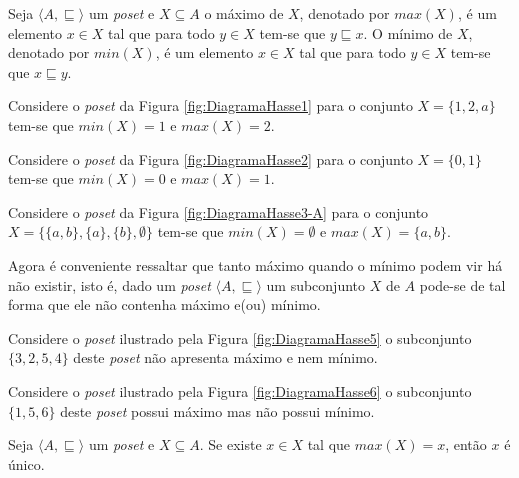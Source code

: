 \begin{definition}\label{def:MaxMinPoset}
	Seja $\langle A, \sqsubseteq \rangle$ um \textit{poset} e $X \subseteq A$ o máximo de $X$, denotado por $max(X)$, é um elemento $x \in X$ tal que para todo $y \in X$ tem-se que $y \sqsubseteq x$. O mínimo de $X$, denotado por $min(X)$,  é um elemento $x \in X$ tal que  para todo $y \in X$ tem-se que $x \sqsubseteq y$.
\end{definition}

\begin{example}
	Considere o \textit{poset} da Figura \ref{fig:DiagramaHasse1} para o conjunto $X = \{1, 2, a\}$ tem-se que $min(X) = 1$ e $max(X) = 2$.
\end{example}

\begin{example}
	Considere o \textit{poset} da Figura \ref{fig:DiagramaHasse2} para o conjunto $X = \{0, 1\}$ tem-se que $min(X) = 0$ e $max(X) = 1$.
\end{example}

\begin{example}
	Considere o \textit{poset} da Figura \ref{fig:DiagramaHasse3-A} para o conjunto $X = \{\{a, b\}, \{a\}, \{b\}, \emptyset\}$ tem-se que $min(X) = \emptyset$ e $max(X) = \{a, b\}$.
\end{example}

Agora é conveniente ressaltar que tanto máximo quando o mínimo podem vir há não existir, isto é, dado um \textit{poset} $\langle A, \sqsubseteq \rangle$ um subconjunto $X$ de $A$ pode-se de tal forma que ele não contenha máximo e(ou) mínimo.

\begin{example}
	Considere o \textit{poset} ilustrado pela Figura \ref{fig:DiagramaHasse5} o subconjunto $\{3, 2, 5, 4\}$ deste \textit{poset} não apresenta máximo e nem mínimo.
\end{example}

\begin{example}
	Considere o \textit{poset} ilustrado pela Figura \ref{fig:DiagramaHasse6} o subconjunto $\{1, 5, 6\}$ deste \textit{poset} possui máximo mas não possui mínimo.
\end{example}

\begin{theorem}\label{teo:UnicidadeMaximoPoset}
	Seja $\langle A, \sqsubseteq \rangle$ um \textit{poset} e $X \subseteq A$. Se existe $x \in X$ tal que $max(X) = x$, então $x$ é único.
\end{theorem}

